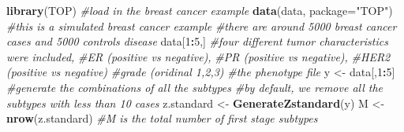 \documentclass[11pt,]{article}
\newenvironment{Shaded}{\begin{snugshade}}{\end{snugshade}}
\newcommand{\KeywordTok}[1]{\textcolor[rgb]{0.13,0.29,0.53}{\textbf{#1}}}
\newcommand{\DataTypeTok}[1]{\textcolor[rgb]{0.13,0.29,0.53}{#1}}
\newcommand{\DecValTok}[1]{\textcolor[rgb]{0.00,0.00,0.81}{#1}}
\newcommand{\StringTok}[1]{\textcolor[rgb]{0.31,0.60,0.02}{#1}}
\newcommand{\CommentTok}[1]{\textcolor[rgb]{0.56,0.35,0.01}{\textit{#1}}}
\newcommand{\OperatorTok}[1]{\textcolor[rgb]{0.81,0.36,0.00}{\textbf{#1}}}
\newcommand{\NormalTok}[1]{#1}
\begin{document}
\begin{Shaded}
\begin{Highlighting}[]
\KeywordTok{library}\NormalTok{(TOP)}
\CommentTok{#load in the breast cancer example}
\KeywordTok{data}\NormalTok{(data, }\DataTypeTok{package=}\StringTok{"TOP"}\NormalTok{)}
\CommentTok{#this is a simulated breast cancer example}
\CommentTok{#there are around 5000 breast cancer cases and 5000 controls disease}
\NormalTok{data[}\DecValTok{1}\OperatorTok{:}\DecValTok{5}\NormalTok{,]}
\CommentTok{#four different tumor characteristics were included, }
\CommentTok{#ER (positive vs negative), }
\CommentTok{#PR (positive vs negative),}
\CommentTok{#HER2 (positive vs negative)}
\CommentTok{#grade (oridinal 1,2,3)}
\CommentTok{#the phenotype file}
\NormalTok{y <-}\StringTok{ }\NormalTok{data[,}\DecValTok{1}\OperatorTok{:}\DecValTok{5}\NormalTok{]}
\CommentTok{#generate the combinations of all the subtypes}
\CommentTok{#by default, we remove all the subtypes with less than 10 cases}
\NormalTok{z.standard <-}\StringTok{ }\KeywordTok{GenerateZstandard}\NormalTok{(y)}
\NormalTok{M <-}\StringTok{ }\KeywordTok{nrow}\NormalTok{(z.standard) }\CommentTok{#M is the total number of first stage subtypes}


\end{Highlighting}
\end{Shaded}
\end{document}
